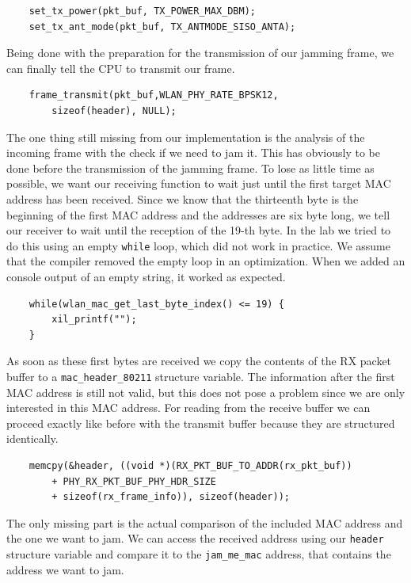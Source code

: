 \documentclass[sigconf]{acmart}
\begin{document}
\begin{verbatim}
	set_tx_power(pkt_buf, TX_POWER_MAX_DBM);
	set_tx_ant_mode(pkt_buf, TX_ANTMODE_SISO_ANTA);
\end{verbatim}

Being done with the preparation for the transmission of our jamming frame, we can finally tell the CPU to transmit
our frame.

\begin{verbatim}
	frame_transmit(pkt_buf,WLAN_PHY_RATE_BPSK12,
	    sizeof(header), NULL);
\end{verbatim}

The one thing still missing from our implementation is the analysis of the incoming frame with the check if we
need to jam it. This has obviously to be done before the transmission of the jamming frame.
To lose as little time as possible, we want our receiving function to wait just until the first target MAC address
has been received. Since we know that the thirteenth byte is the beginning of the first MAC address and the
addresses are six byte long, we tell our receiver to wait until the reception of the 19-th byte. In the lab we tried
to do this using an empty \texttt{while} loop, which did not work in practice. We assume that the compiler
removed the empty loop in an optimization. When we added an console output of an empty string, it worked as
expected.

\begin{verbatim}
	while(wlan_mac_get_last_byte_index() <= 19) {
	    xil_printf("");
	}
\end{verbatim}

As soon as these first bytes are received we copy the contents of the RX packet buffer to a \texttt{mac\_header\_80211}
structure variable. The information after the first MAC address is still not valid, but this does not pose a problem
since we are only interested in this MAC address. For reading from the receive buffer we can proceed exactly 
like before with the transmit buffer because they are structured identically.

\begin{verbatim}
	memcpy(&header, ((void *)(RX_PKT_BUF_TO_ADDR(rx_pkt_buf))
	    + PHY_RX_PKT_BUF_PHY_HDR_SIZE
	    + sizeof(rx_frame_info)), sizeof(header));
\end{verbatim}

The only missing part is the actual comparison of the included MAC address and the one we want to jam. We can
access the received address using our \texttt{header} structure variable and compare it to the \texttt{jam\_me\_mac}
address, that contains the address we want to jam.
\end{document}
